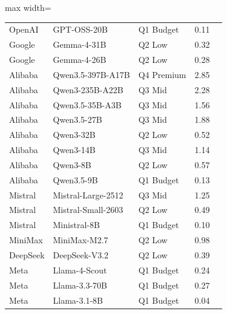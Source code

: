 \documentclass{article}
\begin{document}
\begin{table}[h]
\begin{adjustbox}{max width=\linewidth}
\begin{tabular}{lllrl}
OpenAI     & GPT-OSS-20B                   & Q1 Budget  &  0.11 & \citep{openai2025gptoss} \\
Google     & Gemma-4-31B                   & Q2 Low     &  0.32 & \citep{gemma2025gemma3} \\
Google     & Gemma-4-26B                   & Q2 Low     &  0.28 & \citep{gemma2025gemma3} \\
Alibaba    & Qwen3.5-397B-A17B             & Q4 Premium &  2.85 & \citep{yang2025qwen3} \\
Alibaba    & Qwen3-235B-A22B               & Q3 Mid     &  2.28 & \citep{yang2025qwen3} \\
Alibaba    & Qwen3.5-35B-A3B               & Q3 Mid     &  1.56 & \citep{yang2025qwen3} \\
Alibaba    & Qwen3.5-27B                   & Q3 Mid     &  1.88 & \citep{yang2025qwen3} \\
Alibaba    & Qwen3-32B                     & Q2 Low     &  0.52 & \citep{yang2025qwen3} \\
Alibaba    & Qwen3-14B                     & Q3 Mid     &  1.14 & \citep{yang2025qwen3} \\
Alibaba    & Qwen3-8B                      & Q2 Low     &  0.57 & \citep{yang2025qwen3} \\
Alibaba    & Qwen3.5-9B                    & Q1 Budget  &  0.13 & \citep{yang2025qwen3} \\
Mistral    & Mistral-Large-2512            & Q3 Mid     &  1.25 & \citep{mistral2025large3} \\
Mistral    & Mistral-Small-2603            & Q2 Low     &  0.49 & \citep{mistral2026small4} \\
Mistral    & Ministral-8B                  & Q1 Budget  &  0.10 & \citep{mistral2024ministral} \\
MiniMax    & MiniMax-M2.7                  & Q2 Low     &  0.98 & \citep{minimax2025m27} \\
DeepSeek   & DeepSeek-V3.2                 & Q2 Low     &  0.39 & \citep{deepseek2024v3} \\
Meta       & Llama-4-Scout                 & Q1 Budget  &  0.24 & \citep{meta2025llama4} \\
Meta       & Llama-3.3-70B                 & Q1 Budget  &  0.27 & \citep{grattafiori2024llama3} \\
Meta       & Llama-3.1-8B                  & Q1 Budget  &  0.04 & \citep{grattafiori2024llama3} \\
\bottomrule
\end{tabular}
\end{adjustbox}
\end{table}
\end{document}
